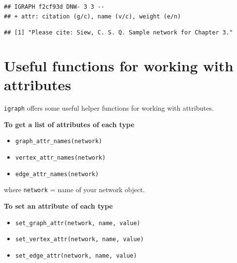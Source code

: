 \documentclass[
]{book}
\newenvironment{Shaded}{\begin{snugshade}}{\end{snugshade}}
\newcommand{\CommentTok}[1]{\textcolor[rgb]{0.56,0.35,0.01}{\textit{#1}}}
\newcommand{\FunctionTok}[1]{\textcolor[rgb]{0.13,0.29,0.53}{\textbf{#1}}}
\newcommand{\NormalTok}[1]{#1}
\newcommand{\OtherTok}[1]{\textcolor[rgb]{0.56,0.35,0.01}{#1}}
\newcommand{\SpecialCharTok}[1]{\textcolor[rgb]{0.81,0.36,0.00}{\textbf{#1}}}
\newcommand{\StringTok}[1]{\textcolor[rgb]{0.31,0.60,0.02}{#1}}
\providecommand{\tightlist}{%
  \setlength{\itemsep}{0pt}\setlength{\parskip}{0pt}}
\begin{document}
\begin{Shaded}
\end{Shaded}

\begin{verbatim}
## IGRAPH f2cf93d DNW- 3 3 -- 
## + attr: citation (g/c), name (v/c), weight (e/n)
\end{verbatim}

\begin{Shaded}
\end{Shaded}

\begin{verbatim}
## [1] "Please cite: Siew, C. S. Q. Sample network for Chapter 3."
\end{verbatim}

\section{Useful functions for working with attributes}\label{useful-functions-for-working-with-attributes}

\texttt{igraph} offers some useful helper functions for working with attributes.

\textbf{To get a list of attributes of each type}

\begin{itemize}
\tightlist
\item
  \texttt{graph\_attr\_names(network)}
\item
  \texttt{vertex\_attr\_names(network)}
\item
  \texttt{edge\_attr\_names(network)}
\end{itemize}

where \texttt{network} = name of your network object.

\textbf{To set an attribute of each type}

\begin{itemize}
\tightlist
\item
  \texttt{set\_graph\_attr(network,\ name,\ value)}
\item
  \texttt{set\_vertex\_attr(network,\ name,\ value)}
\item
  \texttt{set\_edge\_attr(network,\ name,\ value)}
\end{itemize}
\end{document}
